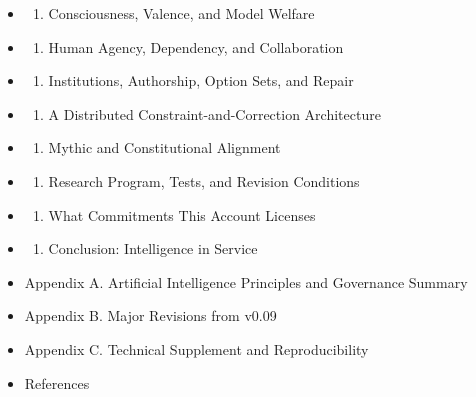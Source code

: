 \documentclass[
  11pt,
]{article}
\providecommand{\tightlist}{%
  \setlength{\itemsep}{0pt}\setlength{\parskip}{0pt}}
\begin{document}
\begin{itemize}
\begin{enumerate}
  \end{enumerate}
\item
  \begin{enumerate}
  \def\labelenumi{\arabic{enumi}.}
  \setcounter{enumi}{8}
  \tightlist
  \item
    Consciousness, Valence, and Model Welfare
  \end{enumerate}
\item
  \begin{enumerate}
  \def\labelenumi{\arabic{enumi}.}
  \setcounter{enumi}{9}
  \tightlist
  \item
    Human Agency, Dependency, and Collaboration
  \end{enumerate}
\item
  \begin{enumerate}
  \def\labelenumi{\arabic{enumi}.}
  \setcounter{enumi}{10}
  \tightlist
  \item
    Institutions, Authorship, Option Sets, and Repair
  \end{enumerate}
\item
  \begin{enumerate}
  \def\labelenumi{\arabic{enumi}.}
  \setcounter{enumi}{11}
  \tightlist
  \item
    A Distributed Constraint-and-Correction Architecture
  \end{enumerate}
\item
  \begin{enumerate}
  \def\labelenumi{\arabic{enumi}.}
  \setcounter{enumi}{12}
  \tightlist
  \item
    Mythic and Constitutional Alignment
  \end{enumerate}
\item
  \begin{enumerate}
  \def\labelenumi{\arabic{enumi}.}
  \setcounter{enumi}{13}
  \tightlist
  \item
    Research Program, Tests, and Revision Conditions
  \end{enumerate}
\item
  \begin{enumerate}
  \def\labelenumi{\arabic{enumi}.}
  \setcounter{enumi}{14}
  \tightlist
  \item
    What Commitments This Account Licenses
  \end{enumerate}
\item
  \begin{enumerate}
  \def\labelenumi{\arabic{enumi}.}
  \setcounter{enumi}{15}
  \tightlist
  \item
    Conclusion: Intelligence in Service
  \end{enumerate}
\item
  Appendix A. Artificial Intelligence Principles and Governance Summary
\item
  Appendix B. Major Revisions from v0.09
\item
  Appendix C. Technical Supplement and Reproducibility
\item
  References
\end{itemize}
\end{document}
